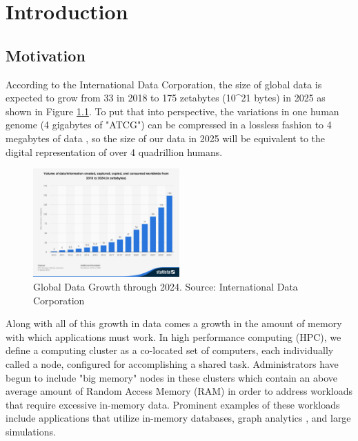 \chapter{Introduction} \label{introduction}

\section{Motivation}
According to the International Data Corporation, the size of global data is expected to grow from 33 in 2018 to 175 zetabytes (10^21 bytes) in 2025 as shown in Figure \ref{fig:data_growth}. \cite{IDS} To put that into perspective, the variations in one human genome (4 gigabytes of "ATCG") can be compressed in a lossless fashion to 4 megabytes of data \cite{genome_size}, so the size of our data in 2025 will be equivalent to the digital representation of over 4 quadrillion humans. 

\begin{figure}[h]
\centering
\includegraphics[width=0.5\textwidth]{Figures/global_data_growth.jpg}
\caption{Global Data Growth through 2024. Source: International Data Corporation}
\label{fig:data_growth}
\end{figure}

Along with all of this growth in data comes a growth in the amount of memory with which applications must work. In high performance computing (HPC), we define a computing cluster as a co-located set of computers, each individually called a node, configured for accomplishing a shared task.  Administrators have begun to include "big memory" nodes in these clusters which contain an above average amount of Random Access Memory (RAM) in order to address workloads that require excessive in-memory data. Prominent examples of these workloads include applications that utilize in-memory databases, graph analytics \cite{virtual_memory_tlb}, and large simulations. 

